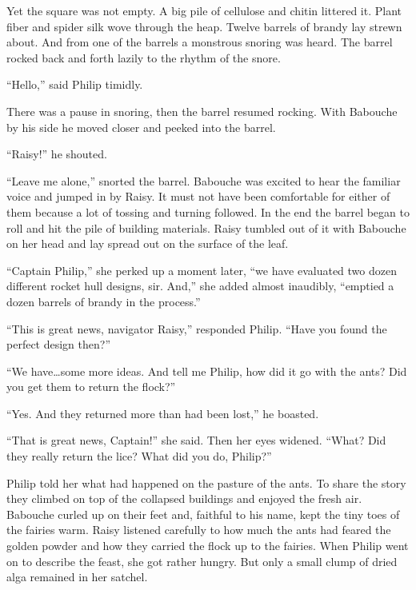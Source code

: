 \documentclass[10pt, draft]{memoir}
\begin{document}
Yet the square was not empty. A big pile of cellulose and chitin littered it. Plant fiber and spider silk wove through the heap. Twelve barrels of brandy lay strewn about. And from one of the barrels a monstrous snoring was heard. The barrel rocked back and forth lazily to the rhythm of the snore.

``Hello,'' said Philip timidly.

There was a pause in snoring, then the barrel resumed rocking. With Babouche by his side he moved closer and peeked into the barrel.

``Raisy!'' he shouted.

``Leave me alone,'' snorted the barrel. Babouche was excited to hear the familiar voice and jumped in by Raisy. It must not have been comfortable for either of them because a lot of tossing and turning followed. In the end the barrel began to roll and hit the pile of building materials. Raisy tumbled out of it with Babouche on her head and lay spread out on the surface of the leaf.

``Captain Philip,'' she perked up a moment later, ``we have evaluated two dozen different rocket hull designs, sir. And,'' she added almost inaudibly, ``emptied a dozen barrels of brandy in the process.''

``This is great news, navigator Raisy,'' responded Philip. ``Have you found the perfect design then?''

``We have\dots some more ideas. And tell me Philip, how did it go with the ants? Did you get them to return the flock?''

``Yes. And they returned more than had been lost,'' he boasted.

``That is great news, Captain!'' she said. Then her eyes widened. ``What? Did they really return the lice? What did you do, Philip?''

Philip told her what had happened on the pasture of the ants. To share the story they climbed on top of the collapsed buildings and enjoyed the fresh air. Babouche curled up on their feet and, faithful to his name, kept the tiny toes of the fairies warm. Raisy listened carefully to how much the ants had feared the golden powder and how they carried the flock up to the fairies. When Philip went on to describe the feast, she got rather hungry. But only a small clump of dried alga remained in her satchel.
\end{document}
